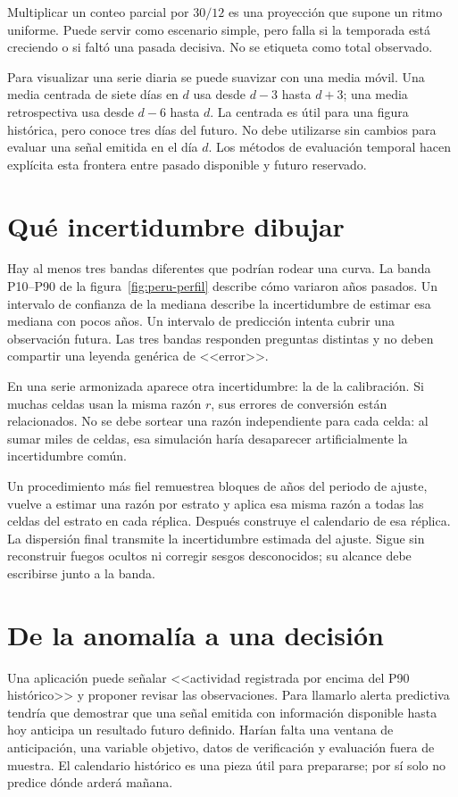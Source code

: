 Multiplicar un conteo parcial por $30/12$ es una proyección que supone un ritmo uniforme.
Puede servir como escenario simple, pero falla si la temporada está creciendo o si faltó
una pasada decisiva. No se etiqueta como total observado.

Para visualizar una serie diaria se puede suavizar con una media móvil. Una media centrada
de siete días en $d$ usa desde $d-3$ hasta $d+3$; una media retrospectiva usa desde $d-6$
hasta $d$. La centrada es útil para una figura histórica, pero conoce tres días del futuro.
No debe utilizarse sin cambios para evaluar una señal emitida en el día $d$.
Los métodos de evaluación temporal hacen explícita esta frontera entre pasado disponible
y futuro reservado.

\FloatBarrier
\section{Qué incertidumbre dibujar}

Hay al menos tres bandas diferentes que podrían rodear una curva. La banda P10--P90 de la
figura~\ref{fig:peru-perfil} describe cómo variaron años pasados. Un intervalo de confianza
de la mediana describe la incertidumbre de estimar esa mediana con pocos años. Un intervalo
de predicción intenta cubrir una observación futura. Las tres bandas responden preguntas
distintas y no deben compartir una leyenda genérica de <<error>>.

En una serie armonizada aparece otra incertidumbre: la de la calibración. Si muchas
celdas usan la misma razón $r$, sus errores de conversión están relacionados. No se debe
sortear una razón independiente para cada celda: al sumar miles de celdas, esa simulación
haría desaparecer artificialmente la incertidumbre común.

Un procedimiento más fiel remuestrea bloques de años del periodo de ajuste, vuelve a
estimar una razón por estrato y aplica esa misma razón a todas las celdas del estrato en
cada réplica. Después construye el calendario de esa réplica. La dispersión final transmite
la incertidumbre estimada del ajuste. Sigue sin reconstruir fuegos ocultos ni corregir
sesgos desconocidos; su alcance debe escribirse junto a la banda.

\FloatBarrier
\section{De la anomalía a una decisión}

Una aplicación puede señalar <<actividad registrada por encima del P90 histórico>> y
proponer revisar las observaciones. Para llamarlo alerta predictiva tendría que demostrar
que una señal emitida con información disponible hasta hoy anticipa un resultado futuro
definido. Harían falta una ventana de anticipación, una variable objetivo, datos de
verificación y evaluación fuera de muestra. El calendario histórico es una pieza útil
para prepararse; por sí solo no predice dónde arderá mañana.

